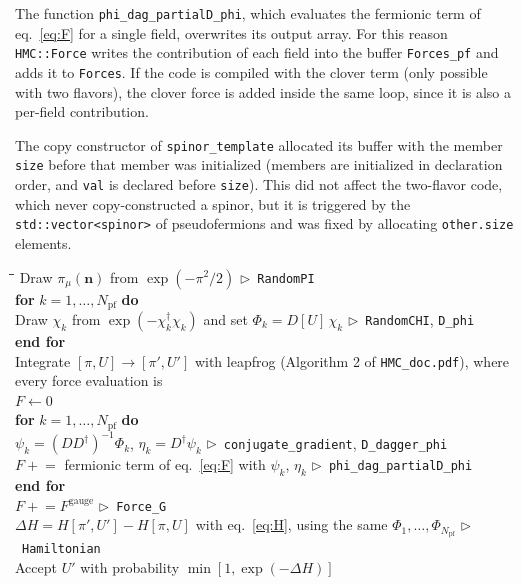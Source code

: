 \documentclass[11pt,a4paper]{article}
\newcommand{\n}{\mathbf{n}}
\newcommand{\Npf}{N_{\mathrm{pf}}}
\newcommand{\code}[1]{\texttt{#1}}
\newcommand{\hmcdoc}{\texttt{HMC\_doc.pdf}}
\begin{document}
The function \code{phi\_dag\_partialD\_phi}, which evaluates the fermionic term of eq.~\eqref{eq:F} for a single
field, overwrites its output array. For this reason \code{HMC::Force} writes the contribution of each field into
the buffer \code{Forces\_pf} and adds it to \code{Forces}. If the code is compiled with the clover term (only possible
with two flavors), the clover force is added inside the same loop, since it is also a per-field contribution.

The copy constructor of \code{spinor\_template} allocated its buffer with the member \code{size} before that member
was initialized (members are initialized in declaration order, and \code{val} is declared before \code{size}). This
did not affect the two-flavor code, which never copy-constructed a spinor, but it is triggered by the
\code{std::vector<spinor>} of pseudofermions and was fixed by allocating \code{other.size} elements.

\begin{algorithm}[h]
\caption{One HMC trajectory with $\Npf$ pseudofermion fields ($\Npf = 2$ for four flavors)}
\label{alg:traj}
\begin{tabbing}
\hspace*{1.5em}\=\hspace*{1.5em}\=\hspace*{1.5em}\=\kill
Draw $\pi_\mu(\n)$ from $\exp(-\pi^2/2)$ \quad$\triangleright$~\code{RandomPI} \\
\textbf{for} $k = 1,\dots,\Npf$ \textbf{do} \\
\> Draw $\chi_k$ from $\exp(-\chi_k^\dagger\chi_k)$ and set $\Phi_k = D[U]\,\chi_k$
 \quad$\triangleright$~\code{RandomCHI}, \code{D\_phi} \\
\textbf{end for} \\
Integrate $[\pi,U]\to[\pi',U']$ with leapfrog (Algorithm 2 of \hmcdoc), where every force evaluation is \\
\> $F \leftarrow 0$ \\
\> \textbf{for} $k = 1,\dots,\Npf$ \textbf{do} \\
\>\> $\psi_k = (DD^\dagger)^{-1}\Phi_k$, \quad $\eta_k = D^\dagger\psi_k$ \quad$\triangleright$~\code{conjugate\_gradient}, \code{D\_dagger\_phi} \\
\>\> $F \mathrel{+}=$ fermionic term of eq.~\eqref{eq:F} with $\psi_k$, $\eta_k$ \quad$\triangleright$~\code{phi\_dag\_partialD\_phi} \\
\> \textbf{end for} \\
\> $F \mathrel{+}= F^{\mathrm{gauge}}$ \quad$\triangleright$~\code{Force\_G} \\
$\Delta H = H[\pi',U'] - H[\pi,U]$ with eq.~\eqref{eq:H}, using the same $\Phi_1,\dots,\Phi_{\Npf}$ \quad$\triangleright$~\code{Hamiltonian} \\
Accept $U'$ with probability $\min[1,\exp(-\Delta H)]$
\end{tabbing}
\end{algorithm}
\end{document}
